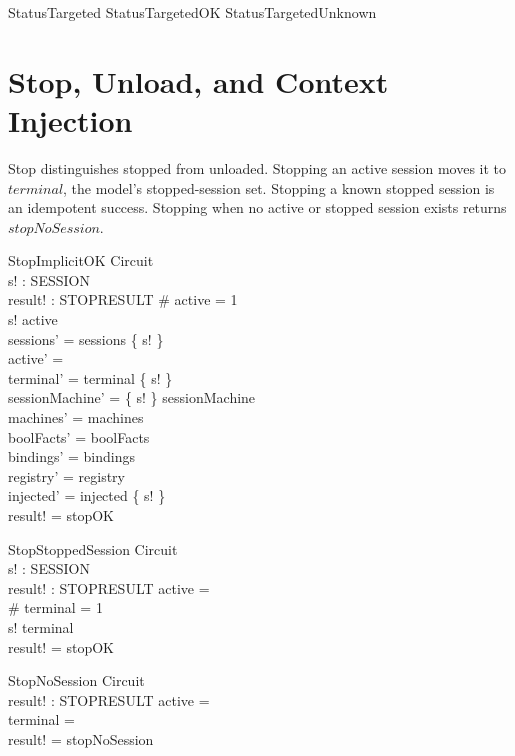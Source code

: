 \documentclass[a4paper,10pt,fleqn]{article}
\begin{document}
\begin{zed}
  StatusTargeted  StatusTargetedOK \lor StatusTargetedUnknown
\end{zed}

\section{Stop, Unload, and Context Injection}

Stop distinguishes stopped from unloaded. Stopping an active session moves it to
$terminal$, the model's stopped-session set. Stopping a known stopped session is
an idempotent success. Stopping when no active or stopped session exists returns
$stopNoSession$.

\begin{schema}{StopImplicitOK}
  \Delta Circuit \\
  s! : SESSION \\
  result! : STOPRESULT
\where
  \# active = 1 \\
  s! \in active \\
  sessions' = sessions \setminus \{ s! \} \\
  active' = \emptyset \\
  terminal' = terminal \setminus \{ s! \} \\
  sessionMachine' = \{ s! \} \ndres sessionMachine \\
  machines' = machines \\
  boolFacts' = boolFacts \\
  bindings' = bindings \\
  registry' = registry \\
  injected' = injected \setminus \{ s! \} \\
  result! = stopOK
\end{schema}

\begin{schema}{StopStoppedSession}
  \Xi Circuit \\
  s! : SESSION \\
  result! : STOPRESULT
\where
  active = \emptyset \\
  \# terminal = 1 \\
  s! \in terminal \\
  result! = stopOK
\end{schema}

\begin{schema}{StopNoSession}
  \Xi Circuit \\
  result! : STOPRESULT
\where
  active = \emptyset \\
  terminal = \emptyset \\
  result! = stopNoSession
\end{schema}
\end{document}
